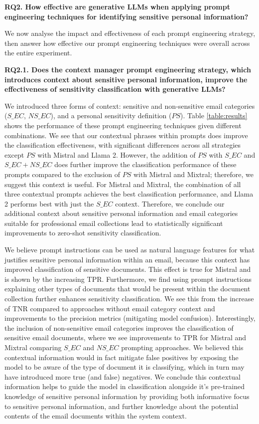\textbf{RQ2. How effective are generative LLMs when applying prompt engineering techniques for identifying sensitive personal information?}

We now analyse the impact and effectiveness of each prompt engineering strategy, then answer how effective our prompt engineering techniques were overall across the entire experiment.

\textbf{RQ2.1. Does the context manager prompt engineering strategy, which introduces context about sensitive personal information, improve the effectiveness of sensitivity classification with generative LLMs?}

We introduced three forms of context: sensitive and non-sensitive email categories ($S\_EC$, $NS\_EC$), and a personal sensitivity definition ($PS$). Table \ref{table:results} shows the performance of these prompt engineering techniques given different combinations. We see that our contextual phrases within prompts does improve the classification effectiveness, with significant differences across all strategies except $PS$ with Mistral and Llama 2. However, the addition of $PS$ with $S\_EC$ and $S\_EC+NS\_EC$ does further improve the classification performance of these prompts compared to the exclusion of $PS$ with Mistral and Mixtral; therefore, we suggest this context is useful. For Mistral and Mixtral, the combination of all three contextual prompts achieves the best classification performance, and Llama 2 performs best with just the $S\_EC$ context. Therefore, we conclude our additional context about sensitive personal information and email categories suitable for professional email collections lead to statistically significant improvements to zero-shot sensitivity classification.

We believe prompt instructions can be used as natural language features for what justifies sensitive personal information within an email, because this context has improved classification of sensitive documents. This effect is true for Mistral and is shown by the increasing TPR. Furthermore, we find using prompt instructions explaining other types of documents that would be present within the document collection further enhances sensitivity classification. We see this from the increase of TNR compared to approaches without email category context and improvements to the precision metrics (mitigating model confusion). Interestingly, the inclusion of non-sensitive email categories improves the classification of sensitive email documents, where we see improvements to TPR for Mistral and Mixtral comparing $S\_EC$ and $NS\_EC$ prompting approaches. We believed this contextual information would in fact mitigate false positives by exposing the model to be aware of the type of document it is classifying, which in turn may have introduced more true (and false) negatives. We conclude this contextual information helps to guide the model in classification alongside it’s pre-trained knowledge of sensitive personal information by providing both informative focus to sensitive personal information, and further knowledge about the potential contents of the email documents within the system context.

